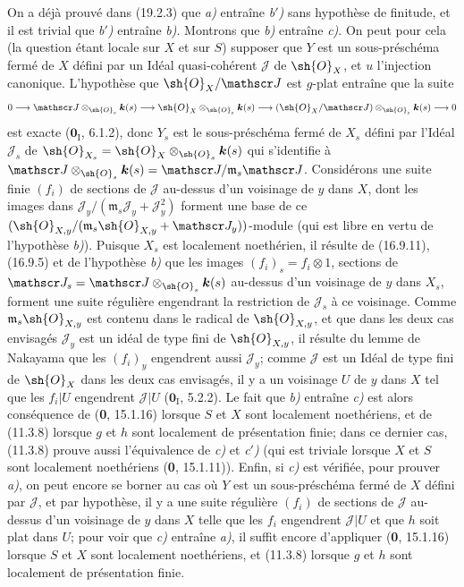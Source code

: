 On a déjà prouvé dans (19.2.3) que \emph{a)} entraîne \emph{b$'$)} sans hypothèse de finitude, et il est trivial que \emph{b$'$)} entraîne \emph{b)}. Montrons que \emph{b)} entraîne \emph{c)}. On peut pour cela (la question étant locale sur $X$ et sur $S$) supposer que $Y$ est un sous-préschéma fermé de $X$ défini par un Idéal quasi-cohérent $\mathscr J$ de $\sh{O}_X$, et $u$ l'injection canonique. L'hypothèse que $\sh{O}_X/\mathscr J$ est $g$-plat entraîne que la suite
\[
  0\longrightarrow\mathscr J\otimes_{\sh{O}_s}\boldsymbol{k}(s)\longrightarrow\sh{O}_X\otimes_{\sh{O}_s}\boldsymbol{k}(s)\longrightarrow(\sh{O}_X/\mathscr J)\otimes_{\sh{O}_s}\boldsymbol{k}(s)\longrightarrow0
\]
est exacte ($\mathbf{0}_{\mathrm I}$, 6.1.2), donc $Y_s$ est le sous-préschéma fermé de $X_s$ défini par l'Idéal $\mathscr J_s$ de $\sh{O}_{X_s}=\sh{O}_X\otimes_{\sh{O}_s}\boldsymbol{k}(s)$ qui s'identifie à $\mathscr J\otimes_{\sh{O}_s}\boldsymbol{k}(s)=\mathscr J/\mathfrak m_s\mathscr J$. Considérons une suite finie $(f_i)$ de sections de $\mathscr J$ au-dessus d'un voisinage de $y$ dans $X$, dont les images dans $\mathscr J_y/(\mathfrak m_s\mathscr J_y+\mathscr J_y^2)$ forment une base de ce $(\sh{O}_{X,y}/(\mathfrak m_s\sh{O}_{X,y}+\mathscr J_y))$-module (qui est libre en vertu de l'hypothèse \emph{b)}). Puisque $X_s$ est localement noethérien, il résulte de (16.9.11), (16.9.5) et de l'hypothèse \emph{b)} que les images $(f_i)_s=f_i\otimes1$, sections de $\mathscr J_s=\mathscr J\otimes_{\sh{O}_s}\boldsymbol{k}(s)$ au-dessus d'un voisinage de $y$ dans $X_s$, forment une suite régulière engendrant la restriction de $\mathscr J_s$ à ce voisinage. Comme $\mathfrak m_s\sh{O}_{X,y}$ est contenu dans le radical de $\sh{O}_{X,y}$, et que dans les deux cas envisagés $\mathscr J_y$ est un idéal de type fini de $\sh{O}_{X,y}$, il résulte du lemme de Nakayama que les $(f_i)_y$ engendrent aussi $\mathscr J_y$; comme $\mathscr J$ est un Idéal de type fini de $\sh{O}_X$ dans les deux cas envisagés, il y a un voisinage $U$ de $y$ dans $X$ tel que les $f_i|U$ engendrent $\mathscr J|U$ ($\mathbf{0}_{\mathrm I}$, 5.2.2). Le fait que \emph{b)} entraîne \emph{c)} est alors conséquence de (\textbf{0}, 15.1.16) lorsque $S$ et $X$ sont localement noethériens, et de (11.3.8) lorsque $g$ et $h$ sont localement de présentation finie; dans ce dernier cas, (11.3.8) prouve aussi l'équivalence de \emph{c)} et \emph{c$'$)} (qui est triviale lorsque $X$ et $S$ sont localement noethériens (\textbf{0}, 15.1.11)). Enfin, si \emph{c)} est vérifiée, pour prouver \emph{a)}, on peut encore se borner au cas où $Y$ est un sous-préschéma fermé de $X$ défini par $\mathscr J$, et par hypothèse, il y a une suite régulière $(f_i)$ de sections de $\mathscr J$ au-dessus d'un voisinage de $y$ dans $X$ telle que les $f_i$ engendrent $\mathscr J|U$ et que $h$ soit plat dans $U$; pour voir que \emph{c)} entraîne \emph{a)}, il suffit encore d'appliquer (\textbf{0}, 15.1.16) lorsque $S$ et $X$ sont localement noethériens, et (11.3.8) lorsque $g$ et $h$ sont localement de présentation finie.

